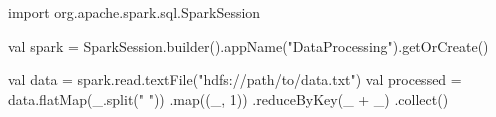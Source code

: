import org.apache.spark.sql.SparkSession

val spark = SparkSession.builder().appName("DataProcessing").getOrCreate()

val data = spark.read.textFile("hdfs://path/to/data.txt")
val processed = data.flatMap(_.split(" "))
                    .map((_, 1))
                    .reduceByKey(_ + _)
                    .collect()